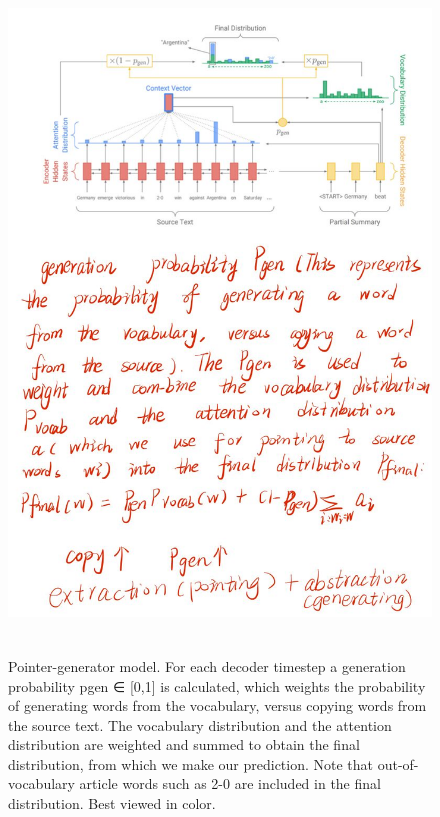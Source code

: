 \documentclass[UTF8]{ctexart}
\begin{document}
    \begin{figure}[htbp]
        \centering
        \vspace{-0.35cm} 
        \includegraphics[width=14cm,height=18cm]{pictures/22.jpg}
        \caption{Pointer-generator model. For each decoder timestep a generation probability pgen ∈ [0,1] is
        calculated, which weights the probability of generating words from the vocabulary, versus copying words
        from the source text. The vocabulary distribution and the attention distribution are weighted and summed
        to obtain the final distribution, from which we make our prediction. Note that out-of-vocabulary article
        words such as 2-0 are included in the final distribution. Best viewed in color.}
    \end{figure}
\end{document}
